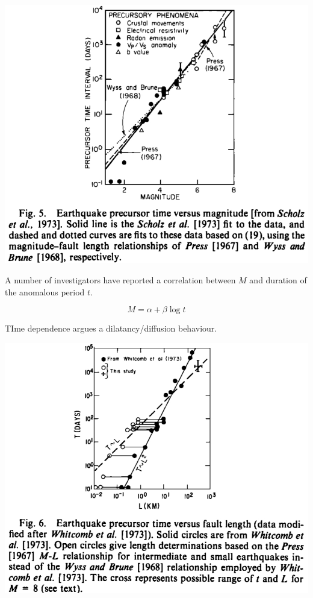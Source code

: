 \documentclass[aspectratio=43,9pt]{beamer}
\begin{document}
\begin{frame}{}

\begin{center}
  \includegraphics[width=0.6\linewidth]{Figs/figure_5.jpg}
\end{center}

 

A number of investigators have reported a correlation between 
$M$ and duration of the anomalous period $t$.

\begin{equation}
 M = \alpha + \beta \log t
\end{equation}

TIme dependence argues a dilatancy/diffusion behaviour.

\end{frame}


\begin{frame}{}

\begin{center}
  \includegraphics[width=0.6\linewidth]{Figs/figure_6.jpg}
\end{center}

\end{frame}
\end{document}
